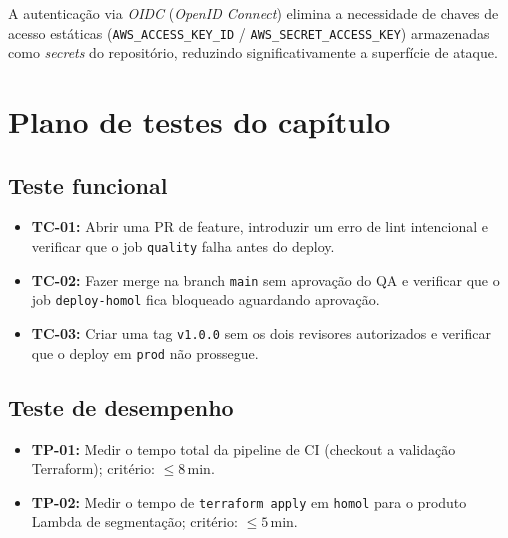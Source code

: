 A autentica\c{c}\~ao via \textit{OIDC}
(\textit{OpenID Connect}) elimina a necessidade de chaves de acesso
est\'aticas (\texttt{AWS\_ACCESS\_KEY\_ID} / \texttt{AWS\_SECRET\_ACCESS\_KEY})
armazenadas como \textit{secrets} do reposit\'orio, reduzindo
significativamente a superf\'icie de ataque.

\section{Plano de testes do cap\'itulo}

\subsection{Teste funcional}

\begin{itemize}[leftmargin=*]
  \item \textbf{TC-01:} Abrir uma PR de feature, introduzir um erro de
        lint intencional e verificar que o job \texttt{quality} falha
        antes do deploy.
  \item \textbf{TC-02:} Fazer merge na branch \texttt{main} sem
        aprova\c{c}\~ao do QA e verificar que o job \texttt{deploy-homol}
        fica bloqueado aguardando aprova\c{c}\~ao.
  \item \textbf{TC-03:} Criar uma tag \texttt{v1.0.0} sem os dois
        revisores autorizados e verificar que o deploy em \texttt{prod}
        n\~ao prossegue.
\end{itemize}

\subsection{Teste de desempenho}

\begin{itemize}[leftmargin=*]
  \item \textbf{TP-01:} Medir o tempo total da pipeline de CI (checkout
        a valida\c{c}\~ao Terraform); crit\'erio: $\leq 8$\,min.
  \item \textbf{TP-02:} Medir o tempo de \texttt{terraform apply} em
        \texttt{homol} para o produto Lambda de segmenta\c{c}\~ao;
        crit\'erio: $\leq 5$\,min.
\end{itemize}

